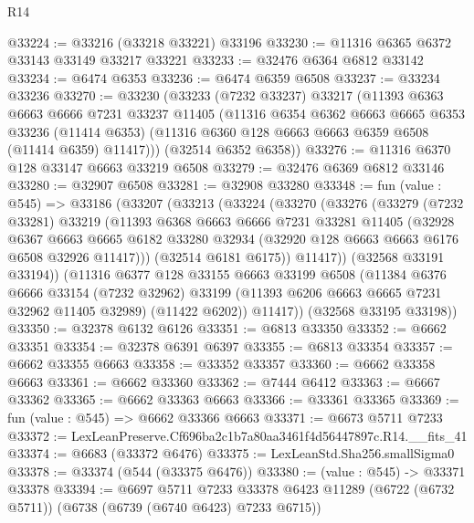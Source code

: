\begin{lexlean}{R14}
\begin{coremodule}
@33224 := @33216 (@33218 @33221) @33196
@33230 := @11316 @6365 @6372 @33143 @33149 @33217 @33221
@33233 := @32476 @6364 @6812 @33142
@33234 := @6474 @6353
@33236 := @6474 @6359 @6508
@33237 := @33234 @33236
@33270 := @33230
    (@33233
      (@7232 @33237)
      @33217
      (@11393
        @6363
        @6663
        @6666
        @7231
        @33237
        @11405
        (@11316
          @6354
          @6362
          @6663
          @6665
          @6353
          @33236
          (@11414 @6353)
          (@11316 @6360 @128 @6663 @6663 @6359 @6508 (@11414 @6359) @11417)))
      (@32514 @6352 @6358))
@33276 := @11316 @6370 @128 @33147 @6663 @33219 @6508
@33279 := @32476 @6369 @6812 @33146
@33280 := @32907 @6508
@33281 := @32908 @33280
@33348 := fun (value : @545) =>
  @33186
    (@33207
      (@33213
        (@33224
          (@33270
            (@33276
              (@33279
                (@7232 @33281)
                @33219
                (@11393
                  @6368
                  @6663
                  @6666
                  @7231
                  @33281
                  @11405
                  (@32928
                    @6367
                    @6663
                    @6665
                    @6182
                    @33280
                    @32934
                    (@32920 @128 @6663 @6663 @6176 @6508 @32926 @11417)))
                (@32514 @6181 @6175))
              @11417))
          (@32568 @33191 @33194))
        (@11316
          @6377
          @128
          @33155
          @6663
          @33199
          @6508
          (@11384
            @6376
            @6666
            @33154
            (@7232 @32962)
            @33199
            (@11393 @6206 @6663 @6665 @7231 @32962 @11405 @32989)
            (@11422 @6202))
          @11417))
      (@32568 @33195 @33198))
@33350 := @32378 @6132 @6126
@33351 := @6813 @33350
@33352 := @6662 @33351
@33354 := @32378 @6391 @6397
@33355 := @6813 @33354
@33357 := @6662 @33355 @6663
@33358 := @33352 @33357
@33360 := @6662 @33358 @6663
@33361 := @6662 @33360
@33362 := @7444 @6412
@33363 := @6667 @33362
@33365 := @6662 @33363 @6663
@33366 := @33361 @33365
@33369 := fun (value : @545) => @6662 @33366 @6663
@33371 := @6673 @5711 @7233
@33372 := LexLeanPreserve.Cf696ba2c1b7a80aa3461f4d56447897c.R14.__fits_41
@33374 := @6683 (@33372 @6476)
@33375 := LexLeanStd.Sha256.smallSigma0
@33378 := @33374 (@544 (@33375 @6476))
@33380 := (value : @545) -> @33371 @33378
@33394 := @6697
    @5711
    @7233
    @33378
    @6423
    @11289
    (@6722 (@6732 @5711))
    (@6738 (@6739 (@6740 @6423) @7233 @6715))

\end{coremodule}
\end{lexlean}
